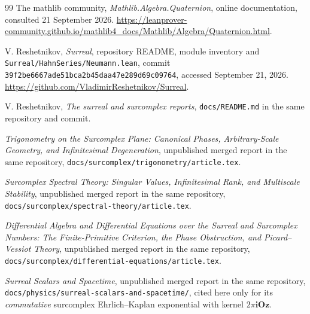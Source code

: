 \documentclass[11pt,letterpaper]{article}
\numberwithin{equation}{section}
\theoremstyle{definition}
\theoremstyle{remark}
\newcommand{\Oz}{\mathbf{Oz}}
\newcommand{\ii}{\mathbf i}
\begin{document}
\begin{thebibliography}{99}
The mathlib community, \emph{Mathlib.Algebra.Quaternion}, online documentation,
consulted 21 September 2026.
\url{https://leanprover-community.github.io/mathlib4_docs/Mathlib/Algebra/Quaternion.html}.

V. Reshetnikov, \emph{Surreal}, repository README, module inventory and
\texttt{Surreal/HahnSeries/Neumann.lean}, commit
\texttt{39f2be6667ade51bca2b45daa47e289d69c09764}, accessed September 21, 2026.
\url{https://github.com/VladimirReshetnikov/Surreal}.

V. Reshetnikov, \emph{The surreal and surcomplex reports}, \texttt{docs/README.md} in the
same repository and commit.

\emph{Trigonometry on the Surcomplex Plane: Canonical Phases, Arbitrary-Scale Geometry,
and Infinitesimal Degeneration}, unpublished merged report in the same repository,
\texttt{docs/surcomplex/trigonometry/article.tex}.

\emph{Surcomplex Spectral Theory: Singular Values, Infinitesimal Rank, and Multiscale
Stability}, unpublished merged report in the same repository,
\texttt{docs/surcomplex/spectral-theory/article.tex}.

\emph{Differential Algebra and Differential Equations over the Surreal and Surcomplex
Numbers: The Finite-Primitive Criterion, the Phase Obstruction, and Picard--Vessiot
Theory}, unpublished merged report in the same repository,
\texttt{docs/surcomplex/differential-equations/article.tex}.

\emph{Surreal Scalars and Spacetime}, unpublished merged report in the same repository,
\texttt{docs/physics/surreal-scalars-and-spacetime/}, cited here only for its
\emph{commutative} surcomplex Ehrlich--Kaplan exponential with kernel $2\pi\ii\Oz$.

\end{thebibliography}
\endgroup
\end{document}
